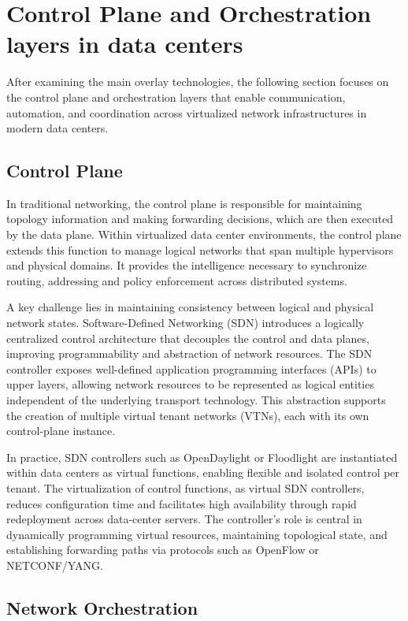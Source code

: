 \section{Control Plane and Orchestration layers in data centers}
After examining the main overlay technologies, the following section focuses on the control plane and orchestration layers that enable communication, automation, and coordination across virtualized network infrastructures in modern data centers.

\subsection{Control Plane}

In traditional networking, the control plane is responsible for maintaining topology information and making forwarding decisions, which are then executed by the data plane. Within virtualized data center environments, the control plane extends this function to manage logical networks that span multiple hypervisors and physical domains. It provides the intelligence necessary to synchronize routing, addressing and policy enforcement across distributed systems.

A key challenge lies in maintaining consistency between logical and physical network states. Software-Defined Networking (SDN) introduces a logically centralized control architecture that decouples the control and data planes, improving programmability and abstraction of network resources. The SDN controller exposes well-defined application programming interfaces (APIs) to upper layers, allowing network resources to be represented as logical entities independent of the underlying transport technology. This abstraction supports the creation of multiple virtual tenant networks (VTNs), each with its own control-plane instance.

In practice, SDN controllers such as OpenDaylight or Floodlight are instantiated within data centers as virtual functions, enabling flexible and isolated control per tenant. The virtualization of control functions, as virtual SDN controllers, reduces configuration time and facilitates high availability through rapid redeployment across data-center servers. The controller’s role is central in dynamically programming virtual resources, maintaining topological state, and establishing forwarding paths via protocols such as OpenFlow or NETCONF/YANG.

\subsection{Network Orchestration}

